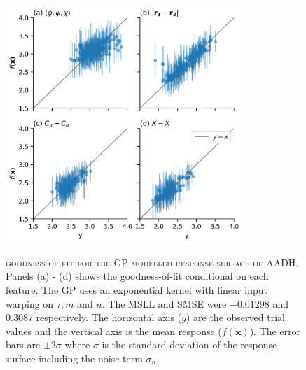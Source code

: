 \begin{figure}
    \centering
    \caption[goodness-of-fit for the GP modelled response surface of AADH]{\textsc{goodness-of-fit for the GP modelled response surface of AADH}.  Panels (a) - (d) shows the goodness-of-fit conditional on each feature. The GP uses an exponential kernel with linear input warping on $\tau, m$ and $n$. The MSLL and SMSE were $-0.01298$ and  $0.3087$ respectively. The horizontal axis ($y$) are the observed trial values and the vertical axis is the mean response ($f(\mathbf{x})$). The error bars are $\pm 2\sigma$ where $\sigma$ is the standard deviation of the response surface including the noise term $\sigma_n$.}
    \includegraphics[width=0.8\textwidth]{chapters/msm_optimization/figures/aadh_response_surface_fit_d.png}
    \label{fig:aadh_rsm_fit}
\end{figure}

